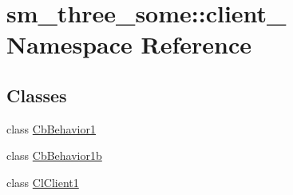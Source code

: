 \hypertarget{namespacesm__three__some_1_1client__1}{}\section{sm\+\_\+three\+\_\+some\+:\+:client\+\_ Namespace Reference}
\label{namespacesm__three__some_1_1client__1}
\subsection*{Classes}
\begin{DoxyCompactItemize}
\item 
class \hyperlink{classsm__three__some_1_1client__1_1_1CbBehavior1}{Cb\+Behavior1}
\item 
class \hyperlink{classsm__three__some_1_1client__1_1_1CbBehavior1b}{Cb\+Behavior1b}
\item 
class \hyperlink{classsm__three__some_1_1client__1_1_1ClClient1}{Cl\+Client1}
\end{DoxyCompactItemize}

